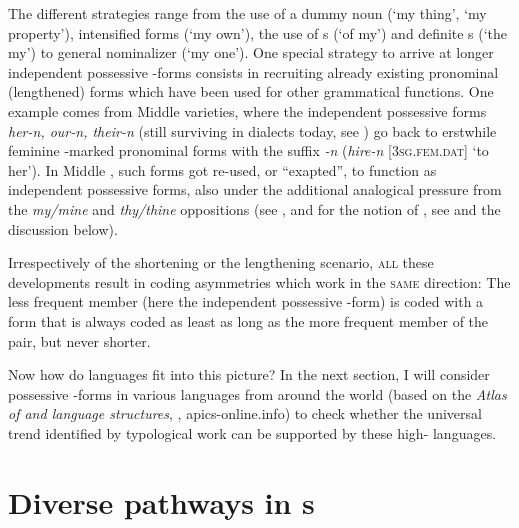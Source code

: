 \documentclass[output=paper]{langsci/langscibook}
\begin{document}
The different strategies range from the use of a dummy noun (‘my thing’, ‘my property’), intensified  forms (‘my own’), the use of s (‘of my’) and definite s (‘the my’) to general nominalizer (‘my one’). One special strategy to arrive at longer independent possessive -forms consists in recruiting already existing pronominal (lengthened) forms which have been used for other grammatical functions. One example comes from Middle  varieties, where the independent possessive forms \textit{her-n, our-n, their-n} (still surviving in  dialects today, see \citealt{KortmannLunkenheimer2013}) go back to erstwhile feminine  -marked pronominal forms with the suffix \textit{{}-n} (\textit{hire-n} [\textsc{3sg.fem.dat}] ‘to her’). In Middle , such  forms got re-used, or “exapted”, to function as independent possessive forms, also under the additional analogical pressure from the \textit{my/mine} and \textit{thy/thine} oppositions (see \citealt{Allen2002}, and for the notion of , see \citealt{Lass1990,Lass2017,NordeVandeVelde2016} and the discussion below). 

Irrespectively of the shortening or the lengthening scenario, \textsc{all} these developments result in coding asymmetries which work in the \textsc{same} direction: The less frequent member (here the independent possessive -form) is coded with a form that is always coded as least as long as the more frequent member of the pair, but never shorter.

\newpage 
Now how do  languages fit into this picture? In the next section, I will consider possessive -forms in various  languages from around the world (based on the \textit{Atlas of  and  language structures}, \citealt{MichaelisEtAl2013}, apics-online.info) to check whether the universal trend identified by typological work can be supported by these high- languages.


\section{Diverse pathways in s}\label{sec:michaelis:4}
\end{document}
